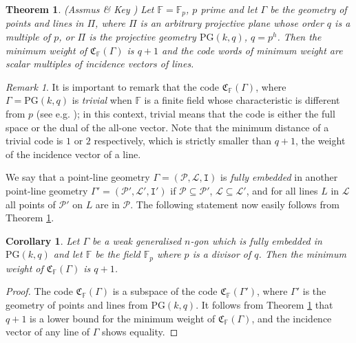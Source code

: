 \documentclass[12pt]{article}
\newcommand{\F}{\mathbb{F}}
\newcommand{\PG}{\mathrm{PG}}
\newcommand{\Points}{\mathcal{P}}
\newcommand{\Lines}{\mathcal{L}}
\newcommand{\I}{\mathtt{I}}
\newcommand{\Code}{\mathfrak{C}_\F}
\newtheorem{theorem}{Theorem}
\newtheorem{corollary}{Corollary}
\theoremstyle{remark}
\newtheorem{remark}{Remark}
\begin{document}
\begin{theorem}\label{AK}(Assmus \& Key \cite[Theorem 6.3.1 and Corollary 5.7.5]{AssmusAndKey})
	Let $\F=\mathbb{F}_p$, $p$ prime and let \(\Gamma\) be the geometry of points and lines in $\Pi$, where $\Pi$ is an arbitrary projective plane whose order $q$ is a multiple of $p$, or $\Pi$ is the projective geometry $\PG(k,q)$, $q=p^h$. Then the minimum weight of \(\Code(\Gamma)\) is \(q+1\) and the code words of minimum weight are scalar multiples of incidence vectors of lines.
\end{theorem}
\begin{remark}\label{remarkfield}
It is important to remark that the code \(\Code(\Gamma)\), where $\Gamma=\PG(k,q)$ is {\em trivial} when $\mathbb{F}$ is a finite field whose characteristic is different from $p$ (see e.g. \cite[Theorem 2.5]{SurveyCodes}); in this context, trivial means that the code is either the full space or the dual of the all-one vector. Note that the minimum distance of a trivial code is $1$ or $2$ respectively, which is strictly smaller than $q+1$, the weight of the incidence vector of a line.
\end{remark}

	We say that a point-line geometry \(\Gamma = (\Points,\Lines,\I)\) is {\em fully embedded} in another point-line geometry $\Gamma' = (\Points',\Lines',\I')$ if
	\(\Points\subseteq\Points'\),		\(\Lines\subseteq\Lines'\),
		and for all lines \(L\) in \(\Lines\) all points of \(\Points'\) on \(L\) are in \(\Points\).
The following statement now easily follows from Theorem \ref{AK}.

\begin{corollary}\label{cor:embedded}
	Let \(\Gamma\) be a weak generalised \(n\)-gon which is fully embedded in $\PG(k, q)$ and let \(\F\) be the field \(\F_p\) where \(p\) is a divisor of \(q\). Then the minimum weight of \(\Code(\Gamma)\) is \(q+1\).
\end{corollary}
\begin{proof}
	The code \(\Code(\Gamma)\) is a subspace of the code \(\Code(\Gamma')\), where $\Gamma'$ is the geometry of points and lines from $\PG(k,q)$. It follows from Theorem \ref{AK} that \(q+1\) is a lower bound for the minimum weight of \(\Code(\Gamma)\), and the incidence vector of any line of \(\Gamma \) shows equality.
\end{proof}
\end{document}
